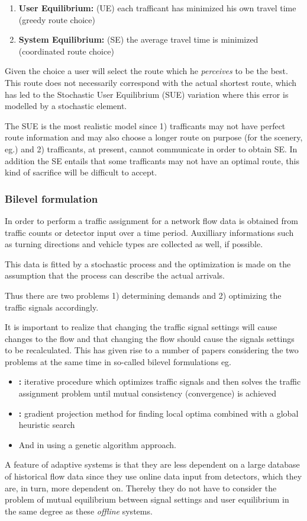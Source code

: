 \begin{enumerate}
\item \textbf{User Equilibrium:} (UE) each trafficant has minimized his own travel time (greedy route choice)
\item \textbf{System Equilibrium:} (SE) the average travel time is minimized (coordinated route choice)
\end{enumerate}

Given the choice a user will select the route which he \textit{perceives} to be the best. This route does not necessarily correspond with the actual shortest route, which has led to the Stochastic User Equilibrium (SUE) variation \cite{32} where this error is modelled by a stochastic element. 

The SUE is the most realistic model since 1) trafficants may not have perfect route information and may also choose a longer route on purpose (for the scenery, eg.) and 2) trafficants, at present, cannot communicate in order to obtain SE. In addition the SE entails that some trafficants may not have an optimal route, this kind of sacrifice will be difficult to accept.

\subsubsection*{Bilevel formulation}
In order to perform a traffic assignment for a network flow data is obtained from traffic counts or detector input over a time period. Auxilliary informations such as turning directions and vehicle types are collected as well, if possible. 

This data is fitted by a stochastic process and the optimization is made on the assumption that the process can describe the actual arrivals.

Thus there are two problems 1) determining demands and 2) optimizing the traffic signals accordingly.

It is important to realize that changing the traffic signal settings will cause changes to the flow and that changing the flow should cause the signals settings to be recalculated. This has given rise to a number of papers considering the two problems at the same time in so-called bilevel formulations eg. 
\begin{itemize}
\item \textbf{\cite{mc}:} iterative procedure which optimizes traffic signals and then solves the traffic assignment problem until mutual consistency (convergence) is achieved
\item \textbf{\cite{34}:} gradient projection method for finding local optima combined with a global heuristic search
\item And in \textbf{\cite{2}} using a genetic algorithm approach.
\end{itemize}

A feature of adaptive systems is that they are less dependent on a large database of historical flow data since they use online data input from detectors, which they are, in turn, more dependent on. Thereby they do not have to consider the problem of mutual equilibrium between signal settings and user equilibrium in the same degree as these \textit{offline} systems.